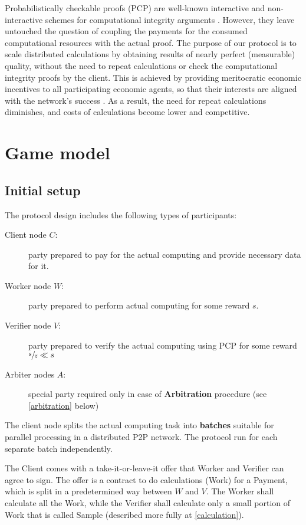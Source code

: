 \documentclass[conference]{IEEEtran}
\begin{document}
Probabilistically checkable proofs (PCP) are well-known interactive and non-interactive schemes for computational integrity arguments \cite{pcp, pcpibm}. However, they leave untouched the question of coupling the payments for the consumed computational resources with the actual proof. The purpose of our protocol is to scale distributed calculations by obtaining results of nearly perfect (measurable) quality, without the need to repeat calculations or check the computational integrity proofs by the client. This is achieved by providing meritocratic economic incentives to all participating economic agents, so that their interests are aligned with the network's success \cite{anonymity, bitcoin}. As a result, the need for repeat calculations diminishes, and costs of calculations become lower and competitive.

\section{Game model}
\label{gamemodel}

\subsection{Initial setup}
\label{setup}

The protocol design includes the following types of participants:
\begin{description}
    \item[Client node $C$:] party prepared to pay for the actual computing and provide necessary data for it.
    \item[Worker node $W$:] party prepared to perform actual computing for some reward $s$.
    \item[Verifier node $V$:] party prepared to verify the actual computing using PCP for some reward $\sfrac{s}{z} \ll s$
    \item[Arbiter nodes $A$:] special party required only in case of \textbf{Arbitration} procedure (see \ref{arbitration} below)
\end{description}

The client node splits the actual computing task into \textbf{batches} suitable for parallel processing in a distributed P2P network. The protocol run for each separate batch independently.

The Client comes with a take-it-or-leave-it offer that Worker and Verifier can agree to sign. The offer is a contract to do calculations (Work) for a Payment, which is split in a predetermined way between $W$ and $V$. The Worker shall calculate all the Work, while the Verifier shall calculate only a small portion of Work that is called Sample (described more fully at \ref{calculation}). 
\end{document}
